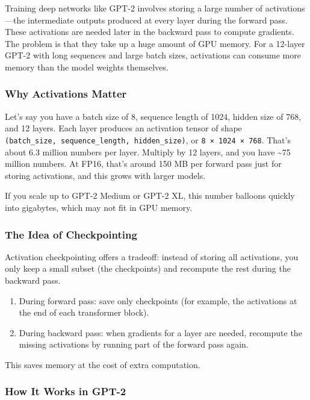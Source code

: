 \documentclass[
  letterpaper,
  DIV=11,
  numbers=noendperiod]{scrreprt}
\providecommand{\tightlist}{%
  \setlength{\itemsep}{0pt}\setlength{\parskip}{0pt}}
\begin{document}
Training deep networks like GPT-2 involves storing a large number of
activations---the intermediate outputs produced at every layer during
the forward pass. These activations are needed later in the backward
pass to compute gradients. The problem is that they take up a huge
amount of GPU memory. For a 12-layer GPT-2 with long sequences and large
batch sizes, activations can consume more memory than the model weights
themselves.

\subsubsection{Why Activations Matter}\label{why-activations-matter}

Let's say you have a batch size of 8, sequence length of 1024, hidden
size of 768, and 12 layers. Each layer produces an activation tensor of
shape \texttt{(batch\_size,\ sequence\_length,\ hidden\_size)}, or
\texttt{8\ ×\ 1024\ ×\ 768}. That's about 6.3 million numbers per layer.
Multiply by 12 layers, and you have \textasciitilde75 million numbers.
At FP16, that's around 150 MB per forward pass just for storing
activations, and this grows with larger models.

If you scale up to GPT-2 Medium or GPT-2 XL, this number balloons
quickly into gigabytes, which may not fit in GPU memory.

\subsubsection{The Idea of
Checkpointing}\label{the-idea-of-checkpointing}

Activation checkpointing offers a tradeoff: instead of storing all
activations, you only keep a small subset (the checkpoints) and
recompute the rest during the backward pass.

\begin{enumerate}
\def\labelenumi{\arabic{enumi}.}
\tightlist
\item
  During forward pass: save only checkpoints (for example, the
  activations at the end of each transformer block).
\item
  During backward pass: when gradients for a layer are needed, recompute
  the missing activations by running part of the forward pass again.
\end{enumerate}

This saves memory at the cost of extra computation.

\subsubsection{How It Works in GPT-2}\label{how-it-works-in-gpt-2}
\end{document}
